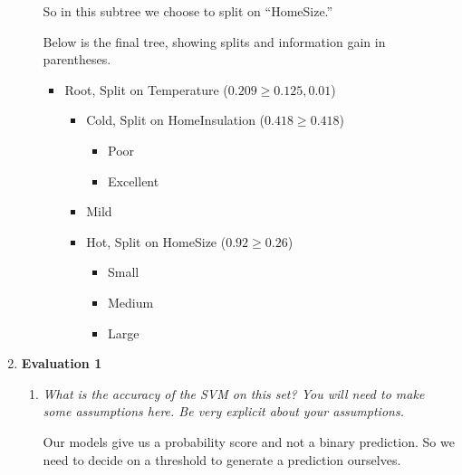 \documentclass[11pt]{article}
\begin{document}
\begin{enumerate}
\begin{enumerate}
                So in this subtree we choose to split on ``HomeSize.''

                Below is the final tree, showing splits and information gain in
                parentheses.

                \newpage
                \begin{itemize}
                    \item Root, Split on Temperature ($0.209 \ge 0.125, 0.01$)
                        \begin{itemize}
                            \item Cold, Split on HomeInsulation ($0.418 \ge 0.418$)
                                \begin{itemize}
                                    \item Poor
                                    \item Excellent
                                \end{itemize}

                            \item Mild

                            \item Hot, Split on HomeSize ($0.92 \ge 0.26$)
                                \begin{itemize}
                                    \item Small
                                    \item Medium
                                    \item Large
                                \end{itemize}
                        \end{itemize}
                \end{itemize}
        \end{enumerate}

    \item \textbf{Evaluation 1}
        \begin{enumerate}
            \item \textit{What is the accuracy of the SVM on this set? You will
                need to make some assumptions here. Be very explicit about your
                assumptions.}

                Our models give us a probability score and not a binary
                prediction. So we need to decide on a threshold to generate a
                prediction ourselves.


\end{enumerate}
\end{enumerate}
\end{document}
